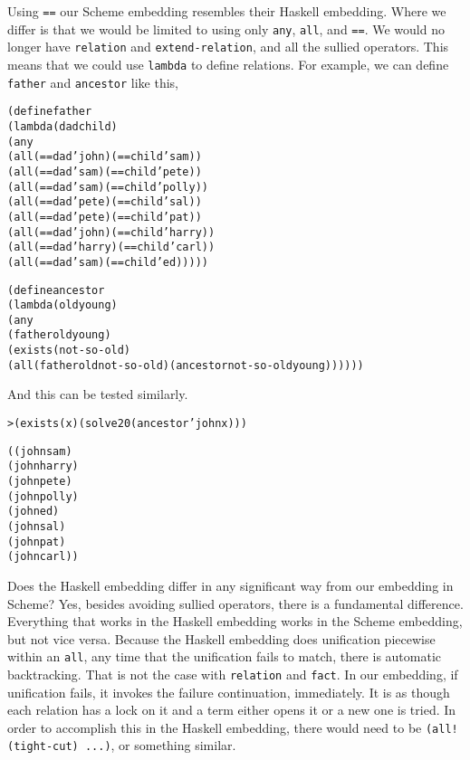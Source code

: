 Using \texttt{==} our Scheme embedding resembles their Haskell
embedding.  Where we differ is that we would be limited to using only
\texttt{any}, \texttt{all}, and \texttt{==}.  We would no longer have
\texttt{relation} and \texttt{extend-relation}, and all the sullied
operators.  This means that we could use \texttt{lambda} to define
relations.  For example, we can define \texttt{father} and
\texttt{ancestor} like this,

\begin{alltt}
(define father
  (lambda (dad child)
    (any
      (all (== dad 'john) (== child 'sam))
      (all (== dad 'sam) (== child 'pete))
      (all (== dad 'sam) (== child 'polly))
      (all (== dad 'pete) (== child 'sal))
      (all (== dad 'pete) (== child 'pat))
      (all (== dad 'john) (== child 'harry))
      (all (== dad 'harry) (== child 'carl))
      (all (== dad 'sam) (== child 'ed)))))
\end{alltt}
\newpage
\begin{alltt}
(define ancestor
  (lambda (old young)
    (any
      (father old young)
      (exists (not-so-old)
        (all (father old not-so-old) (ancestor not-so-old young))))))
\end{alltt}

\noindent
And this can be tested similarly.
\begin{alltt}
> (exists (x) (solve 20 (ancestor 'john x)))

((john sam)
 (john harry)
 (john pete)
 (john polly)
 (john ed)
 (john sal)
 (john pat)
 (john carl))
\end{alltt}

Does the Haskell embedding differ in any significant way from our
embedding in Scheme?  Yes, besides avoiding sullied operators, there
is a fundamental difference.  Everything that works in the Haskell
embedding works in the Scheme embedding, but not vice versa.  Because
the Haskell embedding does unification piecewise within an
\texttt{all}, any time that the unification fails to match, there is
automatic backtracking.  That is not the case with \texttt{relation}
and \texttt{fact}.  In our embedding, if unification fails, it invokes
the failure continuation, immediately.  It is as though each relation
has a lock on it and a term either opens it or a new one is tried.  In
order to accomplish this in the Haskell embedding, there would need to
be \texttt{(all! (tight-cut) ...)}, or something similar.

